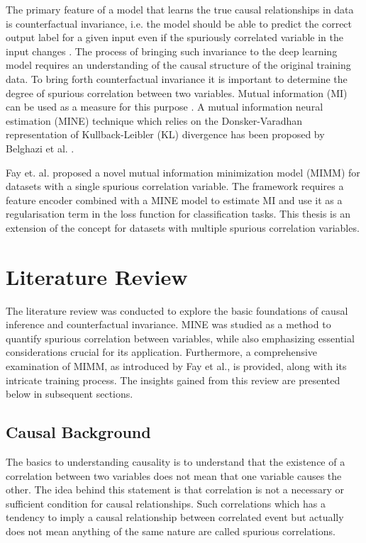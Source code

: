 \documentclass[12pt,DIV14,BCOR12mm,a4paper,footinclude=false,headinclude,parskip=half-,twoside,openright,cleardoublepage=empty,toc=index,bibliography=totoc,listof=totoc]{scrreprt}
\numberwithin{equation}{chapter}
\begin{document}
The primary feature of a model that learns the true causal relationships in data is counterfactual invariance, i.e. the model should be able to predict the correct output label for a given input even if the spuriously correlated variable in the input changes \cite{DBLP:journals/corr/abs-2106-00545}. The process of bringing such invariance to the deep learning model requires an understanding of the causal structure of the original training data. To bring forth counterfactual invariance it is important to determine the degree of spurious correlation between two variables. Mutual information (MI) can be used as a measure for this purpose \cite{10162210}. A mutual information neural estimation (MINE) technique which relies on the Donsker-Varadhan representation of Kullback-Leibler (KL) divergence has been proposed by Belghazi et al.  \cite{DBLP:journals/corr/abs-1801-04062}.

Fay et. al. \cite{10162210} proposed a novel mutual information minimization model (MIMM) for datasets with a single spurious correlation variable. The framework requires a feature encoder combined with a MINE model to estimate MI and use it as a regularisation term in the loss function for classification tasks. This thesis is an extension of the concept for datasets with multiple spurious correlation variables.

\chapter{Literature Review}
The literature review was conducted to explore the basic foundations of causal inference and counterfactual invariance. MINE was studied as a method to quantify spurious correlation between variables, while also emphasizing essential considerations crucial for its application. Furthermore, a comprehensive examination of MIMM, as introduced by Fay et al., is provided, along with its intricate training process. The insights gained from this review are presented below in subsequent sections.

\section{Causal Background}
The basics to understanding causality is to understand that the existence of a correlation between two variables does not mean that one variable causes the other\cite{peters_2017_elements}\cite{ward_2012_spurious}. The idea behind this statement is that correlation is not a necessary or sufficient condition for causal relationships. Such correlations which has a tendency to imply a causal relationship between correlated event but actually does not mean anything of the same nature are called spurious correlations. 
\end{document}
